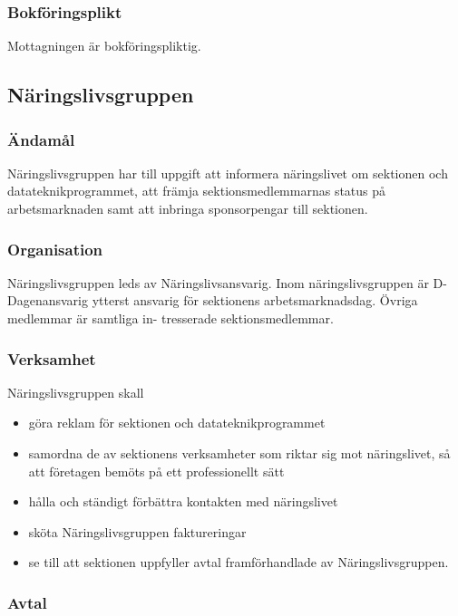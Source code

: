\documentclass{dgovdoc}
\begin{document}
\subsubsection{Bokföringsplikt}

Mottagningen är bokföringspliktig.

\subsection{Näringslivsgruppen}

\subsubsection{Ändamål}

Näringslivsgruppen har till uppgift att informera näringslivet om sektionen och
datateknikprogrammet, att främja sektionsmedlemmarnas status på arbetsmarknaden
samt att inbringa sponsorpengar till sektionen.

\subsubsection{Organisation}

Näringslivsgruppen leds av Näringslivsansvarig. Inom näringslivsgruppen är D-Dagenansvarig
ytterst ansvarig för sektionens arbetsmarknadsdag. Övriga medlemmar är samtliga in-
tresserade sektionsmedlemmar.

\subsubsection{Verksamhet}

Näringslivsgruppen skall

\begin{itemize}
  \item göra reklam för sektionen och datateknikprogrammet
  \item samordna de av sektionens verksamheter som riktar sig mot näringslivet,
    så att företagen bemöts på ett professionellt sätt
  \item hålla och ständigt förbättra kontakten med näringslivet
  \item sköta Näringslivsgruppen faktureringar
  \item se till att sektionen uppfyller avtal framförhandlade av
    Näringslivsgruppen.
\end{itemize}

\subsubsection{Avtal}
\end{document}
